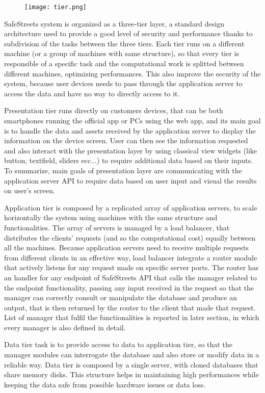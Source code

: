 \begin{figure}[H]
	\texttt{[image: tier.png]}
\end{figure}

SafeStreets system is organized as a three-tier layer, a standard design architecture used to provide a good level of security and performance thanks to subdivision of the tasks between the three tiers. Each tier runs on a different machine (or a group of machines with same structure), so that every tier is responsible of a specific task and the computational work is splitted between different machines, optimizing performances. This also improve the security of the system, because user devices needs to pass through the application server to access the data and have no way to directly access to it. 

Presentation tier runs directly on customers devices, that can be both smartphones running the official app or PCs using the web app, and its main goal is to handle the data and assets received by the application server to display the information on the device screen. User can then see the information requested and also interact with the presentation layer by using classical view widgets (like button, textfield, sliders ecc...) to require additional data based on their inputs. To summarize, main goals of presentation layer are communicating with the application server API to require data based on user input and visual the results on user's screen.

Application tier is composed by a replicated array of application servers, to scale horizontally the system using machines with the same structure and functionalities. The array of servers is managed by a load balancer, that distributes the clients' requests (and so the computational cost) equally between all the machines. Because application servers need to receive multiple requests from different clients in an effective way, load balancer integrate a router module that actively listens for any request made on specific server ports. The router has an handler for any endpoint of SafeStreets API that calls the manager related to the endpoint functionality, passing any input received in the request so that the manager can correctly consult or manipulate the database and produce an output, that is then returned by the router to the client that made that request. List of manager that fulfil the functionalities is reported in later section, in which every manager is also defined in detail.

Data tier task is to provide access to data to application tier, so that the manager modules can interrogate the database and also store or modify data in a reliable way. Data tier is composed by a single server, with cloned databases that share memory disks. This structure helps in maintaining high performances while keeping the data safe from possible hardware issues or data loss.

